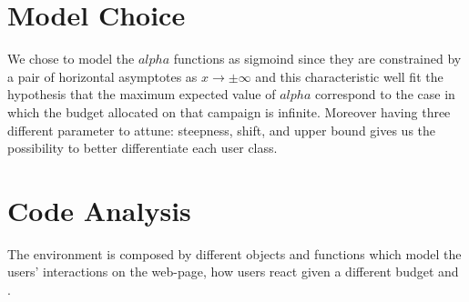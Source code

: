 \section{Model Choice}
\label{sec:env_Motivation}
We chose to model the $alpha$ functions as sigmoind since they are constrained by a pair of horizontal asymptotes as $ x\to\pm\infty$  and this characteristic well fit the hypothesis that the maximum expected value of $alpha$ correspond to the case in which the budget allocated on that campaign is infinite. Moreover having three different parameter to attune: steepness, shift, and upper bound  gives us the possibility to better differentiate each user class.

\section{Code Analysis}
\label{sec:env_Code Analysis}

The environment is composed by different objects and functions which model the users' interactions on the web-page, how users react given a different budget and .
 
